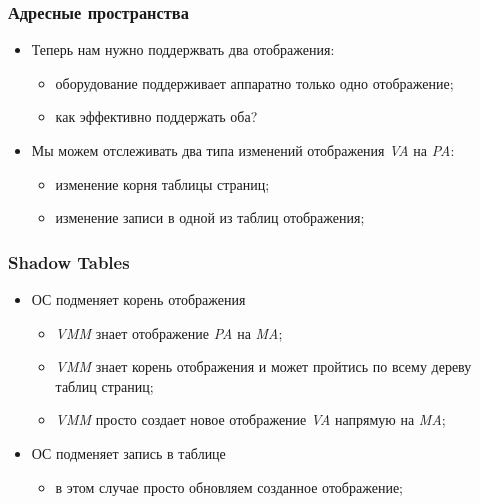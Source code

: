 \begin{frame}
\frametitle{Адресные пространства}
\begin{itemize}
  \item<1-> Теперь нам нужно поддержвать два отображения:
    \begin{itemize}
      \item оборудование поддерживает аппаратно только одно отображение;
      \item как эффективно поддержать оба?
    \end{itemize}
  \item<2-> Мы можем отслеживать два типа изменений отображения \emph{VA} на
        \emph{PA}:
    \begin{itemize}
      \item изменение корня таблицы страниц;
      \item изменение записи в одной из таблиц отображения;
    \end{itemize}
\end{itemize}
\end{frame}

\begin{frame}
\frametitle{Shadow Tables}
\begin{itemize}
  \item<1-> ОС подменяет корень отображения
    \begin{itemize}
      \item \emph{VMM} знает отображение \emph{PA} на \emph{MA};
      \item \emph{VMM} знает корень отображения и может пройтись по всему
            дереву таблиц страниц;
      \item \emph{VMM} просто создает новое отображение \emph{VA} напрямую на
            \emph{MA};
    \end{itemize}
  \item<2-> ОС подменяет запись в таблице
    \begin{itemize}
      \item в этом случае просто обновляем созданное отображение;
    \end{itemize}
\end{itemize}
\end{frame}

